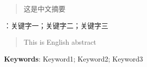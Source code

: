 \newpage
\fancyhead{}
\begin{abstract}
这是中文摘要
\end{abstract}

{：关键字一；关键字二；关键字三}

\newpage
{} %
\renewcommand{\abstractname}{\fontsize{14}{21}\textbf{Abstract}}
\fancyhead{}
\begin{abstract}
This is English abstract
\end{abstract}

{\noindent\textbf{Keywords}: Keyword1; Keyword2; Keyword3}